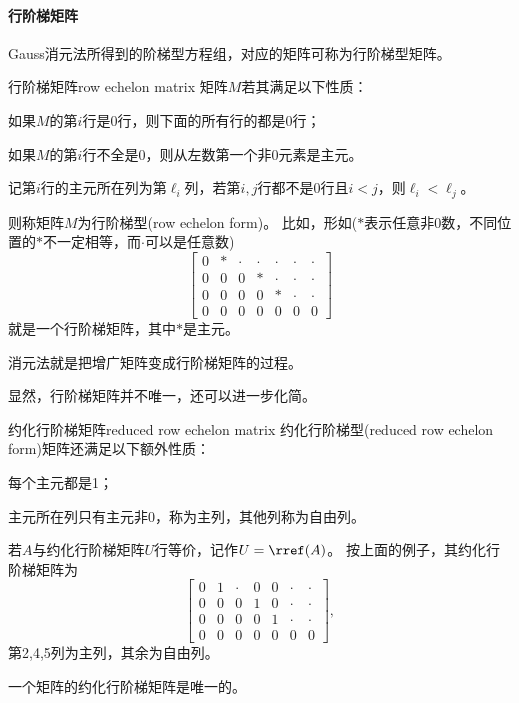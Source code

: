 \paragraph{行阶梯矩阵}

Gauss消元法所得到的阶梯型方程组，对应的矩阵可称为行阶梯型矩阵。

\begin{definition}{行阶梯矩阵}{row echelon matrix}
	矩阵$M$若其满足以下性质：
	\begin{compactitem}
		\item 如果$M$的第$i$行是0行，则下面的所有行的都是0行；
		\item 如果$M$的第$i$行不全是0，则从左数第一个非0元素是主元。
		\item 记第$i$行的主元所在列为第$\ell_i$列，若第$i,j$行都不是0行且$i<j$，则$\ell_i<\ell_j$。
	\end{compactitem}
	则称矩阵$M$为行阶梯型(row echelon form)。
	\tcblower
	比如，形如($\ast$表示任意非0数，不同位置的$\ast$不一定相等，而$\cdot$可以是任意数)
	\[
		\begin{bmatrix}
			0&\ast&\cdot&\cdot&\cdot&\cdot&\cdot\\
			0&0&0&\ast&\cdot&\cdot&\cdot\\
			0&0&0&0&\ast&\cdot&\cdot\\
			0&0&0&0&0&0&0
		\end{bmatrix}
	\]
	就是一个行阶梯矩阵，其中$\ast$是主元。
\end{definition}
\begin{remark}
	消元法就是把增广矩阵变成行阶梯矩阵的过程。
\end{remark}

显然，行阶梯矩阵并不唯一，还可以进一步化简。

\begin{definition}{约化行阶梯矩阵}{reduced row echelon matrix}
	约化行阶梯型(reduced row echelon form)矩阵还满足以下额外性质：
	\begin{compactitem}
		\item 每个主元都是1；
		\item 主元所在列只有主元非0，称为主列，其他列称为自由列。
	\end{compactitem}
	若$A$与约化行阶梯矩阵$U$行等价，记作$U=\rref(A)$。
	\tcblower
	按上面的例子，其约化行阶梯矩阵为
	\[
		\begin{bmatrix}
			0&1&\cdot&0&0&\cdot&\cdot\\
			0&0&0&1&0&\cdot&\cdot\\
			0&0&0&0&1&\cdot&\cdot\\
			0&0&0&0&0&0&0
		\end{bmatrix},
	\]
	第2,4,5列为主列，其余为自由列。
\end{definition}
\begin{theorem}
	{}{}
	一个矩阵的约化行阶梯矩阵是唯一的。
\end{theorem}

